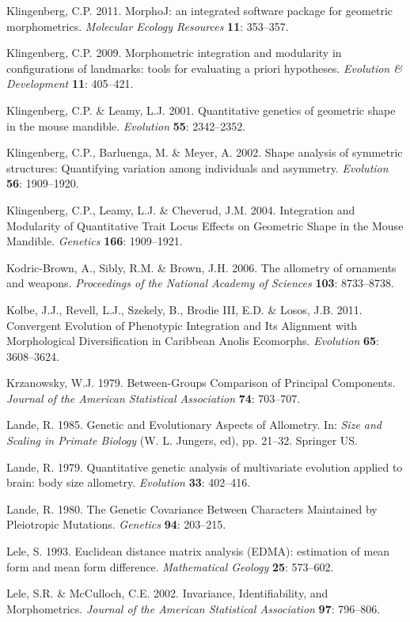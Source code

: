\documentclass[12pt,twoside]{report}
\begin{document}
Klingenberg, C.P. 2011. MorphoJ: an integrated software package for
geometric morphometrics. \emph{Molecular Ecology Resources} \textbf{11}:
353--357.

Klingenberg, C.P. 2009. Morphometric integration and modularity in
configurations of landmarks: tools for evaluating a priori hypotheses.
\emph{Evolution \& Development} \textbf{11}: 405--421.

Klingenberg, C.P. \& Leamy, L.J. 2001. Quantitative genetics of
geometric shape in the mouse mandible. \emph{Evolution} \textbf{55}:
2342--2352.

Klingenberg, C.P., Barluenga, M. \& Meyer, A. 2002. Shape analysis of
symmetric structures: Quantifying variation among individuals and
asymmetry. \emph{Evolution} \textbf{56}: 1909--1920.

Klingenberg, C.P., Leamy, L.J. \& Cheverud, J.M. 2004. Integration and
Modularity of Quantitative Trait Locus Effects on Geometric Shape in the
Mouse Mandible. \emph{Genetics} \textbf{166}: 1909--1921.

Kodric-Brown, A., Sibly, R.M. \& Brown, J.H. 2006. The allometry of
ornaments and weapons. \emph{Proceedings of the National Academy of
Sciences} \textbf{103}: 8733--8738.

Kolbe, J.J., Revell, L.J., Szekely, B., Brodie III, E.D. \& Losos, J.B.
2011. Convergent Evolution of Phenotypic Integration and Its Alignment
with Morphological Diversification in Caribbean Anolis Ecomorphs.
\emph{Evolution} \textbf{65}: 3608--3624.

Krzanowsky, W.J. 1979. Between-Groups Comparison of Principal
Components. \emph{Journal of the American Statistical Association}
\textbf{74}: 703--707.

Lande, R. 1985. Genetic and Evolutionary Aspects of Allometry. In:
\emph{Size and Scaling in Primate Biology} (W. L. Jungers, ed), pp.
21--32. Springer US.

Lande, R. 1979. Quantitative genetic analysis of multivariate evolution
applied to brain: body size allometry. \emph{Evolution} \textbf{33}:
402--416.

Lande, R. 1980. The Genetic Covariance Between Characters Maintained by
Pleiotropic Mutations. \emph{Genetics} \textbf{94}: 203--215.

Lele, S. 1993. Euclidean distance matrix analysis (EDMA): estimation of
mean form and mean form difference. \emph{Mathematical Geology}
\textbf{25}: 573--602.

Lele, S.R. \& McCulloch, C.E. 2002. Invariance, Identifiability, and
Morphometrics. \emph{Journal of the American Statistical Association}
\textbf{97}: 796--806.
\end{document}
